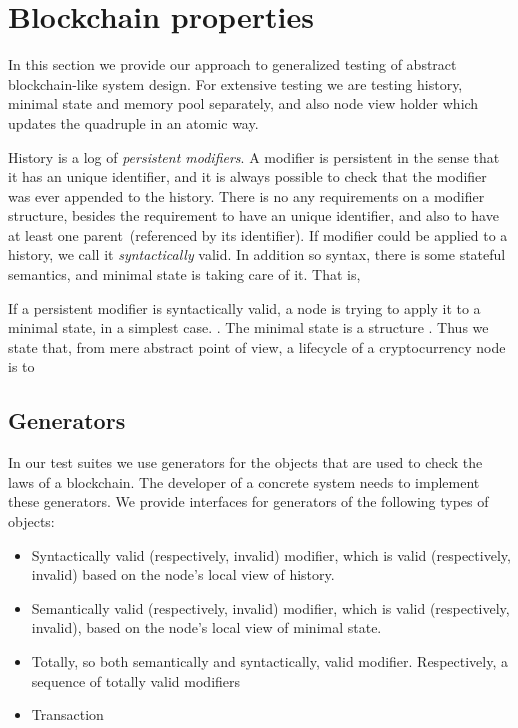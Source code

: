 
\section{Blockchain properties}
\label{sec:props}

In this section we provide our approach to generalized testing of abstract blockchain-like system design. For extensive testing we are  testing history, minimal state and memory pool separately, and also node view holder which updates the quadruple {\em <history, minimal state, vault, memory pool>} in an atomic way.

History is a log of {\em persistent modifiers}. A modifier is persistent in the sense that it has an unique identifier, and it is always possible to check that the modifier was ever appended to the history. There is no any requirements on a modifier structure, besides the requirement to have an unique identifier, and also to have at least one parent~(referenced by its identifier). If modifier could be applied to a history, we call it {\em syntactically} valid. In addition so syntax, there is some stateful semantics, and minimal state is taking care of it. That is, 

If a persistent modifier is syntactically valid, a node is trying to apply it to a minimal state, in a simplest case. . The minimal state is a structure . Thus we state that, from mere abstract point of view, a lifecycle of a cryptocurrency node is to 


\subsection{Generators}

In our test suites we use generators for the objects that are used to check the laws of a blockchain. The developer of a concrete system needs to implement these generators. We provide interfaces for generators of the following types of objects:

\begin{itemize}
	\item{Syntactically valid (respectively, invalid) modifier, which is valid (respectively, invalid) based on the node's local view of history.}
	\item{Semantically valid (respectively, invalid) modifier, which is valid (respectively, invalid), based on the node's local view of minimal state.}
	\item{Totally, so both semantically and syntactically, valid modifier. Respectively, a sequence of totally valid modifiers}
	\item{Transaction}
\end{itemize}

